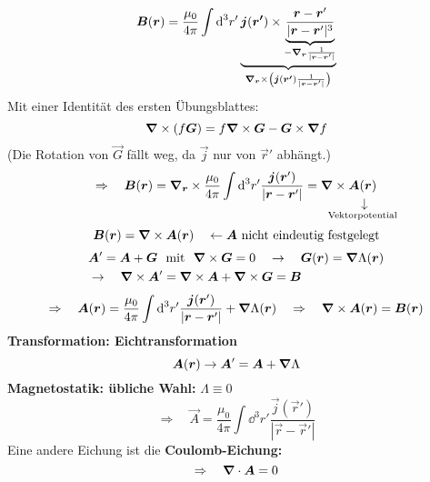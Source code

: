 \begin{equation*}
\bm{B}(\bm{r}) = \frac{\mu_0}{4 \pi} \int \textrm{d}^3 r' \underbrace{\bm{j}(\bm{r'}) \times \underbrace{\frac{\bm{r} - \bm{r}'}{|\bm{r} - \bm{r}'|^3}}_{- \bm{\nabla}_{\bm{r}} \frac{1}{|\bm{r} - \bm{r}'|}}}_{\bm{\nabla}_{\bm{r}} \times \left(\bm{j}(\bm{r'}) \frac{1}{|\bm{r} - \bm{r}'|}\right)}
\end{equation*}
Mit einer Identität des ersten Übungsblattes:
\begin{equation*}
\bm{\nabla} \times (f \bm{G}) = f \bm{\nabla} \times \bm{G} - \bm{G} \times \bm{\nabla} f
\end{equation*}
(Die Rotation von $ \vec{G} $ fällt weg, da $ \vec{j} $ nur von $ \vec{r}' $ abhängt.)
\begin{equation*}
\Rightarrow \quad \vec{B}(\vec{r}) = \vabla_{\vec{r}} \times \frac{\mu_0}{4 \pi} \int \dd^3 r'\frac{\vec{j}(\vec{r}')}{|\vec{r} - \vec{r}'|} = \vabla \times \custo{\rightarrow}{\vec{A}(\vec{r})}{\mathclap{\tx{Vektorpotential}}}
\end{equation*}
\begin{equation*}
\bm{B}(\bm{r}) = \bm{\nabla} \times \bm{A}(\bm{r}) \quad \leftarrow \bm{A} \textrm{ nicht eindeutig festgelegt}
\end{equation*}
\begin{align*}
& \bm{A}' = \bm{A} + \bm{G} \ \textrm{ mit } \ \bm{\nabla} \times \bm{G} = 0 \quad \rightarrow \quad \bm{G}(\bm{r}) = \bm{\nabla} \Lambda (\bm{r})\\
& \rightarrow \quad \bm{\nabla} \times \bm{A}' = \bm{\nabla} \times \bm{A} + \bm{\nabla} \times \bm{G} = \bm{B}
\end{align*}
\begin{equation*}
\Rightarrow \quad \bm{A}(\bm{r}) = \frac{\mu_0}{4 \pi} \int \textrm{d}^3 r' \frac{\bm{j}(\bm{r}')}{|\bm{r} - \bm{r}'|} + \bm{\nabla} \Lambda (\bm{r}) \quad \Rightarrow \quad \bm{\nabla} \times \bm{A}(\bm{r}) = \bm{B}(\bm{r})
\end{equation*}
\textbf{Transformation: Eichtransformation}
\begin{equation*}
\bm{A}(\bm{r}) \rightarrow \bm{A}' = \bm{A} + \bm{\nabla} \Lambda
\end{equation*}
\textbf{Magnetostatik: übliche Wahl:} $ \Lambda \equiv 0 $
\begin{equation*}
\Rightarrow \quad \vec{A} = \frac{\mu_0}{4 \pi} \int \dd ^3 r' \frac{\vec{j}(\vec{r}')}{|\vec{r} - \vec{r}'|}
\end{equation*}
Eine andere Eichung ist die \textbf{Coulomb-Eichung:}
\begin{equation*}
\Rightarrow \quad \bm{\nabla} \cdot \bm{A} = 0
\end{equation*}
